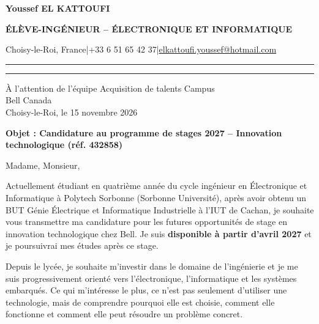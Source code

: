 \documentclass[10pt,a4paper]{article}
\begin{document}
{
{\fontsize{19.6}{21.5}\selectfont\bfseries\color{bleu}Youssef EL KATTOUFI}\par\vspace{2pt}
{\fontsize{9.8}{11}\selectfont\bfseries\color{rouge}ÉLÈVE-INGÉNIEUR -- ÉLECTRONIQUE ET INFORMATIQUE}\par\vspace{3.5pt}
{\fontsize{9.2}{10.2}\selectfont Choisy-le-Roi, France\quad\textcolor{gris}{|}\quad +33 6 51 65 42 37\quad\textcolor{gris}{|}\quad \href{mailto:elkattoufi.youssef@hotmail.com}{elkattoufi.youssef@hotmail.com}}\par}
\vspace{7pt}
\textcolor{rouge}{\rule{1.45cm}{1.65pt}}\hspace{1.5pt}\textcolor{gris!65}{\rule{\dimexpr\linewidth-1.65cm\relax}{.55pt}}\par
\vspace{6pt}

{\fontsize{9.35}{10.5}\selectfont\raggedleft
À l'attention de l'équipe Acquisition de talents Campus\\
Bell Canada\\[3pt]
Choisy-le-Roi, le 15 novembre 2026\par}
\vspace{5pt}
{\fontsize{10}{11.5}\selectfont\bfseries\color{bleu}Objet : Candidature au programme de stages 2027 -- Innovation technologique (réf. 432858)\par}
\vspace{3pt}

\fontsize{10.7}{12.35}\selectfont
Madame, Monsieur,

\justifying
Actuellement étudiant en quatrième année du cycle ingénieur en Électronique et Informatique à Polytech Sorbonne (Sorbonne Université), après avoir obtenu un BUT Génie Électrique et Informatique Industrielle à l'IUT de Cachan, je souhaite vous transmettre ma candidature pour les futures opportunités de stage en innovation technologique chez Bell. Je suis \textbf{disponible à partir d'avril 2027} et je poursuivrai mes études après ce stage.

Depuis le lycée, je souhaite m'investir dans le domaine de l'ingénierie et je me suis progressivement orienté vers l'électronique, l'informatique et les systèmes embarqués. Ce qui m'intéresse le plus, ce n'est pas seulement d'utiliser une technologie, mais de comprendre pourquoi elle est choisie, comment elle fonctionne et comment elle peut résoudre un problème concret.
\end{document}
